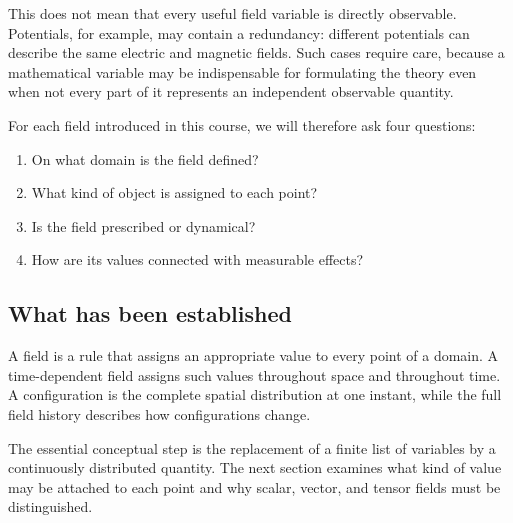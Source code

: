 This does not mean that every useful field variable is directly observable. Potentials, for example, may contain a redundancy: different potentials can describe the same electric and magnetic fields. Such cases require care, because a mathematical variable may be indispensable for formulating the theory even when not every part of it represents an independent observable quantity.

For each field introduced in this course, we will therefore ask four questions:

\begin{enumerate}
    \item On what domain is the field defined?
    \item What kind of object is assigned to each point?
    \item Is the field prescribed or dynamical?
    \item How are its values connected with measurable effects?
\end{enumerate}

\subsection{What has been established}

A field is a rule that assigns an appropriate value to every point of a domain. A time-dependent field assigns such values throughout space and throughout time. A configuration is the complete spatial distribution at one instant, while the full field history describes how configurations change.

The essential conceptual step is the replacement of a finite list of variables by a continuously distributed quantity. The next section examines what kind of value may be attached to each point and why scalar, vector, and tensor fields must be distinguished.